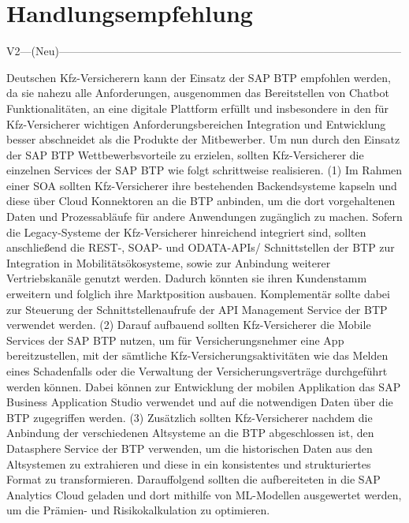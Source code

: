 \chapter{Handlungsempfehlung}


V2—(Neu)---------------------------------------------------------------------------------------------

Deutschen Kfz-Versicherern kann der Einsatz der SAP BTP empfohlen werden, da sie nahezu alle Anforderungen, ausgenommen das Bereitstellen von Chatbot Funktionalitäten, an eine digitale Plattform erfüllt und insbesondere in den für Kfz-Versicherer wichtigen Anforderungsbereichen Integration und Entwicklung besser abschneidet als die Produkte der Mitbewerber. Um nun durch den Einsatz der SAP BTP Wettbewerbsvorteile zu erzielen, sollten Kfz-Versicherer die einzelnen Services der SAP BTP wie folgt schrittweise realisieren. 
(1) Im Rahmen einer SOA sollten Kfz-Versicherer ihre bestehenden Backendsysteme kapseln und diese über Cloud Konnektoren an die BTP anbinden, um die dort vorgehaltenen Daten und Prozessabläufe für andere Anwendungen zugänglich zu machen. Sofern die Legacy-Systeme der Kfz-Versicherer hinreichend integriert sind, sollten anschließend die REST-, SOAP- und ODATA-APIs/ Schnittstellen der BTP zur Integration in Mobilitätsökosysteme, sowie zur Anbindung weiterer Vertriebskanäle genutzt werden. Dadurch könnten sie ihren Kundenstamm erweitern und folglich ihre Marktposition ausbauen. Komplementär sollte dabei zur Steuerung der Schnittstellenaufrufe der API Management Service der BTP verwendet werden.
(2) Darauf aufbauend sollten Kfz-Versicherer die Mobile Services der SAP BTP nutzen, um für Versicherungsnehmer eine App bereitzustellen, mit der sämtliche Kfz-Versicherungsaktivitäten wie das Melden eines Schadenfalls oder die Verwaltung der Versicherungsverträge durchgeführt werden können. Dabei können zur Entwicklung der mobilen Applikation das SAP Business Application Studio verwendet und auf die notwendigen Daten über die BTP zugegriffen werden. 
(3) Zusätzlich sollten Kfz-Versicherer nachdem die Anbindung der verschiedenen Altsysteme an die BTP abgeschlossen ist, den Datasphere Service der BTP verwenden, um die historischen Daten aus den Altsystemen zu extrahieren und diese in ein konsistentes und strukturiertes Format zu transformieren. Darauffolgend sollten die aufbereiteten in die SAP Analytics Cloud geladen und dort mithilfe von ML-Modellen ausgewertet werden, um die Prämien- und Risikokalkulation zu optimieren.

